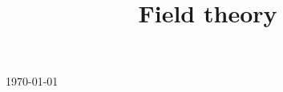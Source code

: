 

\title{Field theory}

\usepackage[sort=standard]{glossaries} 
\makeglossaries



\maketitle
\centerline{\today}
\tableofcontents







